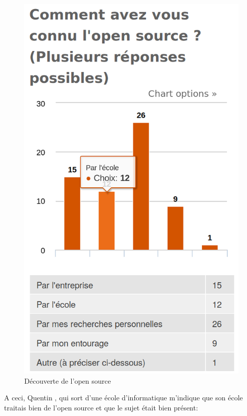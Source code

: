 				\begin{figure}[!htb]
					\center
					\includegraphics[scale=0.28]{./img/a3}
					\caption{Découverte de l'open source}
				\end{figure}

				A ceci, Quentin , qui sort d'une école d'informatique m'indique que son école traitais bien de l'open source et que le sujet était bien présent:

				\begin{center}
					\textit{
					}
				\end{center}

